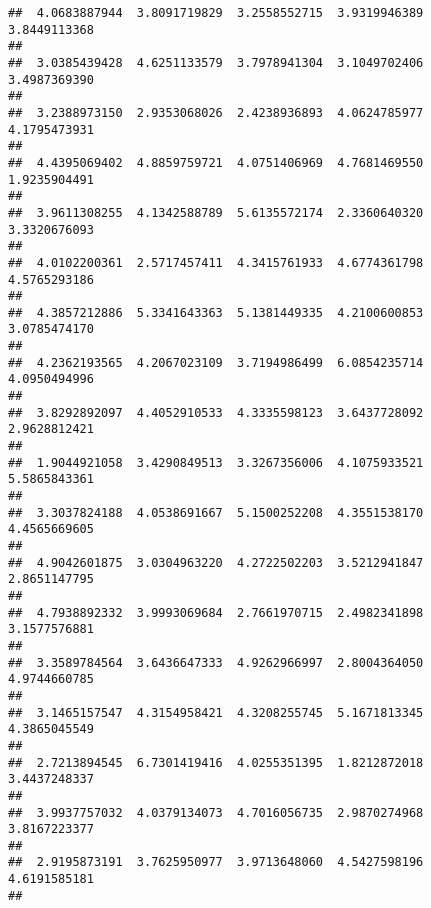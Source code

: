 \documentclass[]{article}
\begin{document}
\begin{verbatim}
##  4.0683887944  3.8091719829  3.2558552715  3.9319946389  3.8449113368 
##                                                                       
##  3.0385439428  4.6251133579  3.7978941304  3.1049702406  3.4987369390 
##                                                                       
##  3.2388973150  2.9353068026  2.4238936893  4.0624785977  4.1795473931 
##                                                                       
##  4.4395069402  4.8859759721  4.0751406969  4.7681469550  1.9235904491 
##                                                                       
##  3.9611308255  4.1342588789  5.6135572174  2.3360640320  3.3320676093 
##                                                                       
##  4.0102200361  2.5717457411  4.3415761933  4.6774361798  4.5765293186 
##                                                                       
##  4.3857212886  5.3341643363  5.1381449335  4.2100600853  3.0785474170 
##                                                                       
##  4.2362193565  4.2067023109  3.7194986499  6.0854235714  4.0950494996 
##                                                                       
##  3.8292892097  4.4052910533  4.3335598123  3.6437728092  2.9628812421 
##                                                                       
##  1.9044921058  3.4290849513  3.3267356006  4.1075933521  5.5865843361 
##                                                                       
##  3.3037824188  4.0538691667  5.1500252208  4.3551538170  4.4565669605 
##                                                                       
##  4.9042601875  3.0304963220  4.2722502203  3.5212941847  2.8651147795 
##                                                                       
##  4.7938892332  3.9993069684  2.7661970715  2.4982341898  3.1577576881 
##                                                                       
##  3.3589784564  3.6436647333  4.9262966997  2.8004364050  4.9744660785 
##                                                                       
##  3.1465157547  4.3154958421  4.3208255745  5.1671813345  4.3865045549 
##                                                                       
##  2.7213894545  6.7301419416  4.0255351395  1.8212872018  3.4437248337 
##                                                                       
##  3.9937757032  4.0379134073  4.7016056735  2.9870274968  3.8167223377 
##                                                                       
##  2.9195873191  3.7625950977  3.9713648060  4.5427598196  4.6191585181 
##                                                                       

\end{verbatim}
\end{document}
